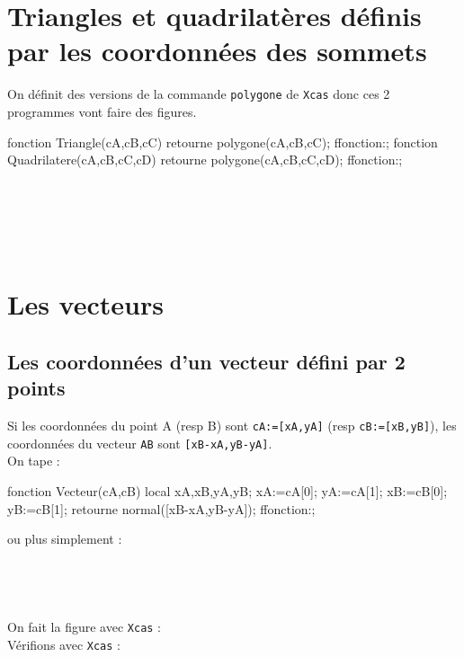 \documentclass[12pt,a4paper]{book}
\begin{document}
\begin{giacjshere}
\section{Triangles et quadrilat\`eres d\'efinis par les coordonn\'ees des sommets}
On d\'efinit des versions de la commande \verb|polygone| de {\tt Xcas} donc ces 2 programmes vont faire des figures.
\begin{giacprog}
fonction Triangle(cA,cB,cC)
 retourne polygone(cA,cB,cC);
ffonction:;
fonction Quadrilatere(cA,cB,cC,cD)
 retourne polygone(cA,cB,cC,cD);
ffonction:;
\end{giacprog}
\\
\\
\\
\\
\section{Les vecteurs}
\subsection{Les coordonn\'ees d'un vecteur d\'efini par 2 points}
Si les coordonn\'ees du point A (resp B) sont {\tt cA:=[xA,yA]} 
(resp {\tt cB:=[xB,yB]}), les coordonn\'ees du vecteur {\tt AB} 
sont {\tt [xB-xA,yB-yA]}.\\
On tape :
\begin{giacprog}
fonction Vecteur(cA,cB)
 local xA,xB,yA,yB;
 xA:=cA[0];
 yA:=cA[1];
 xB:=cB[0];
 yB:=cB[1];
 retourne normal([xB-xA,yB-yA]);
ffonction:;
\end{giacprog}
ou plus simplement :\\
\\
\\
\\
\\
On fait la figure avec {\tt Xcas} :\\
V\'erifions avec {\tt Xcas} :\\


\end{giacjshere}
\end{document}
